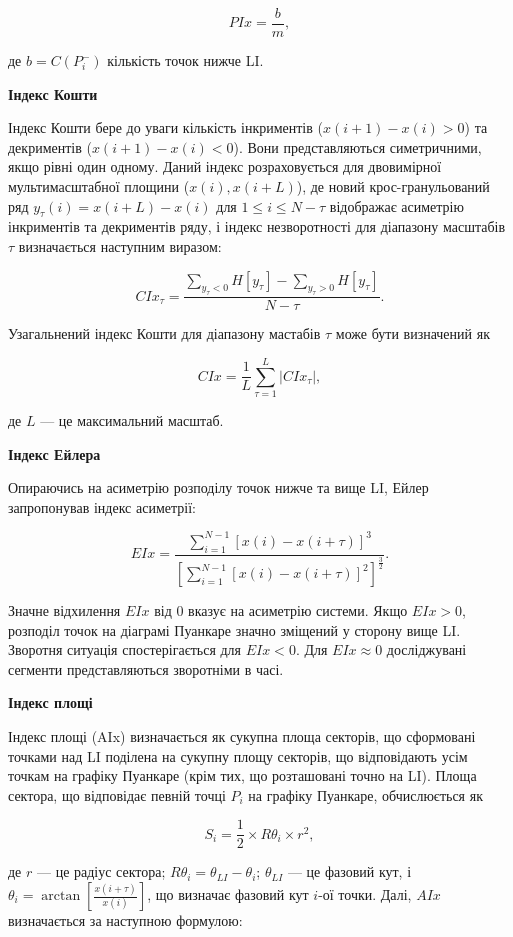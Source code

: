 \documentclass[
  letterpaper,
]{report}
\begin{document}
\[ 
PIx = \frac{b}{m}, 
\]

де \(b = C(P_{i}^{-})\) кількість точок нижче LI.

\textbf{Індекс Кошти}

Індекс Кошти бере до уваги кількість інкриментів (\(x(i+1)-x(i) > 0\))
та декриментів (\(x(i+1)-x(i) < 0\)). Вони представляються симетричними,
якщо рівні один одному. Даний індекс розраховується для двовимірної
мультимасштабної площини (\(x(i), x(i+L)\)), де новий крос-гранульований
ряд \(y_{\tau}(i) = x(i+L)-x(i)\) для \(1 \leq i \leq N-\tau\)
відображає асиметрію інкриментів та декриментів ряду, і індекс
незворотності для діапазону масштабів \(\tau\) визначається наступним
виразом:

\[ 
CIx_{\tau} = \frac{\sum_{y_{\tau}<0} H[y_{\tau}] - \sum_{y_{\tau}>0} H[y_{\tau}]}{N-\tau}. 
\]

Узагальнений індекс Кошти для діапазону мастабів \(\tau\) може бути
визначений як

\[ 
CIx = \frac{1}{L} \sum_{\tau=1}^{L} |CIx_{\tau}|, 
\]

де \(L\) --- це максимальний масштаб.

\textbf{Індекс Ейлера}

Опираючись на асиметрію розподілу точок нижче та вище LI, Ейлер
запропонував індекс асиметрії:

\[ 
EIx = \frac{\sum_{i=1}^{N-1} \left[ x(i)-x(i+\tau) \right]^{3}}{\left[ \sum_{i=1}^{N-1} \left[ x(i)-x(i+\tau) \right]^{2} \right]^{\frac{3}{2}}}. 
\]

Значне відхилення \(EIx\) від 0 вказує на асиметрію системи. Якщо
\(EIx>0\), розподіл точок на діаграмі Пуанкаре значно зміщений у сторону
вище LI. Зворотня ситуація спостерігається для \(EIx<0\). Для
\(EIx \approx 0\) досліджувані сегменти представляються зворотніми в
часі.

\textbf{Індекс площі}

Індекс площі (AIx) визначається як сукупна площа секторів, що сформовані
точками над LI поділена на сукупну площу секторів, що відповідають усім
точкам на графіку Пуанкаре (крім тих, що розташовані точно на LI). Площа
сектора, що відповідає певній точці \(P_{i}\) на графіку Пуанкаре,
обчислюється як

\[ 
S_{i} = \frac{1}{2} \times R\theta_{i} \times r^{2}, 
\]

де \(r\) --- це радіус сектора;
\(R\theta_{i} = \theta_{LI} - \theta_{i}\); \(\theta_{LI}\) --- це
фазовий кут, і
\(\theta_{i} = \arctan{\left[ \frac{x(i+\tau)}{x(i)} \right]}\), що
визначає фазовий кут \(i\)-ої точки. Далі, \(AIx\) визначається за
наступною формулою:
\end{document}
